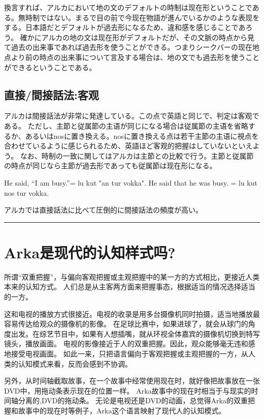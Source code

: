 換言すれば、アルカにおいて地の文のデフォルトの時制は现在形ということである。無時制ではない。まるで目の前で今现在物語が進んでいるかのような表现をする。日本語だとデフォルトが過去形になるため、違和感を感じることであろう。
確かにアルカの地の文は现在形がデフォルトだが、その文脈の時点から見て過去の出来事であれば過去形を使うことができる。つまりシークバーの现在地点より前の時点の出来事について言及する場合は、地の文でも過去形を使うことができるということである。

\subsection{直接/間接話法:客观}

アルカは間接話法が非常に発達している。この点で英語と同じで、判定は客观である。
ただし、主節と従属節の主语が同じになる場合は従属節の主语を省略するか、あるいはnosに置き換える。nosに置き換える点は若干主節の主语に視点を合わせているように感じられるため、英語ほど客观的把握はしていないといえよう。
なお、時制の一致に関してはアルカは主節との比較で行う。主節と従属節の時点が同じなら主節が過去形であっても従属節は现在形になる。

He said, “I am busy.”= lu kut "an tur vokka".
He said that he was busy. = lu kut nos tur vokka.

アルカでは直接話法に比べて圧倒的に間接話法の頻度が高い。
{\noindent} \rule[-10pt]{17.5cm}{0.05em}

\section{Arka是现代的认知样式吗?}
所谓“双重把握”，与偏向客观把握或主观把握中的某一方的方式相比，更接近人类本来的认知方式。
人们总是从主客两方面来把握事态，根据适当的情况选择适当的一方。

这和电视的播放方式很接近。电视的收录是用多台摄像机同时拍摄，适当地播放最容易传达给观众的摄像机的影像。
在足球比赛中，如果进球了，就会从球门的角度出发。在综艺节目中，如果有人想插嘴，就从环视全体嘉宾的摄像机切换到特写镜头，播放画面。
电视的影像接近于人的双重把握。因此，观众能够毫无违和感地接受电视画面。
如此一来，只把语言偏向于客观把握或主观把握的一方，从人类的认知模式来看，反而会感到不协调。

另外，从时间轴截取故事，在一个故事中经常使用现在时，就好像把故事放在一张DVD中，用拖动条表示现在的位置一样。
Arka故事中的现在时相当于与现实的时间轴分离的,DVD的拖动条。
无论是电视还是DVD的动画，总觉得Arka的双重把握和故事中的现在时等例子，Arka这个语言映射了现代人的认知模式。

